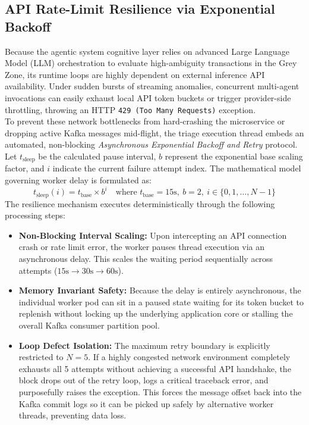 \documentclass[12pt]{report}
\begin{document}
\subsection{API Rate-Limit Resilience via Exponential Backoff}
Because the agentic system cognitive layer relies on advanced Large Language Model (LLM) orchestration to evaluate high-ambiguity transactions in the Grey Zone, its runtime loops are highly dependent on external inference API availability. Under sudden bursts of streaming anomalies, concurrent multi-agent invocations can easily exhaust local API token buckets or trigger provider-side throttling, throwing an HTTP \texttt{429 (Too Many Requests)} exception. 
\\
To prevent these network bottlenecks from hard-crashing the microservice or dropping active Kafka messages mid-flight, the triage execution thread embeds an automated, non-blocking \textit{Asynchronous Exponential Backoff and Retry} protocol. Let $t_{\text{sleep}}$ be the calculated pause interval, $b$ represent the exponential base scaling factor, and $i$ indicate the current failure attempt index. The mathematical model governing worker delay is formulated as:
$$
    t_{\text{sleep}}(i) = t_{\text{base}} \times b^i \quad \text{where } t_{\text{base}} = 15\text{s}, \ b = 2, \ i \in \{0, 1, \dots, N-1\}
$$
The resilience mechanism executes deterministically through the following processing steps:
\begin{itemize}
    \item \textbf{Non-Blocking Interval Scaling:} Upon intercepting an API connection crash or rate limit error, the worker pauses thread execution via an asynchronous delay. This scales the waiting period sequentially across attempts ($15\text{s} \rightarrow 30\text{s} \rightarrow 60\text{s}$).
    \item \textbf{Memory Invariant Safety:} Because the delay is entirely asynchronous, the individual worker pod can sit in a paused state waiting for its token bucket to replenish without locking up the underlying application core or stalling the overall Kafka consumer partition pool.
    \item \textbf{Loop Defect Isolation:} The maximum retry boundary is explicitly restricted to $N=5$. If a highly congested network environment completely exhausts all 5 attempts without achieving a successful API handshake, the block drops out of the retry loop, logs a critical traceback error, and purposefully raises the exception. This forces the message offset back into the Kafka commit logs so it can be picked up safely by alternative worker threads, preventing data loss.
\end{itemize}
\end{document}
